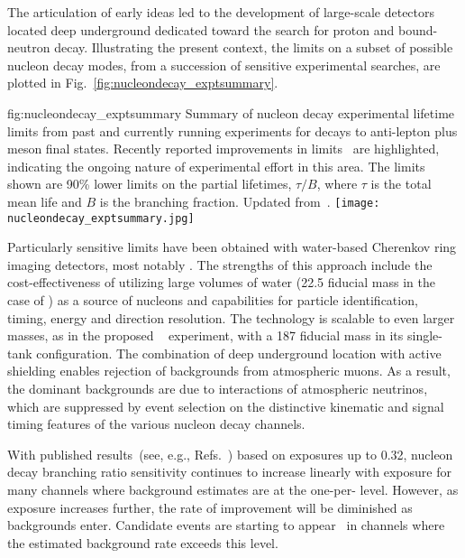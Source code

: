 The articulation of early  ideas led to the development of large-scale 
detectors located deep underground dedicated toward the search for proton and 
bound-neutron decay.  Illustrating the present context, the limits on a subset 
of possible nucleon decay modes, from a succession of sensitive experimental searches, 
are plotted in Fig.~\ref{fig:nucleondecay_exptsummary}.
%
\begin{dunefigure}
{fig:nucleondecay_exptsummary}
{Summary of nucleon decay experimental lifetime limits from past and currently 
running experiments for decays to anti-lepton plus meson final states.  Recently 
reported improvements in limits~\cite{TheSuper-Kamiokande:2017tit} are highlighted, 
indicating the ongoing nature of experimental effort in this area.
The limits shown are 90\%  lower limits on the partial lifetimes, 
$\tau/B$, where $\tau$ is the total mean life and $B$ is the branching fraction. 
Updated from~\cite{Babu:2013jba}.}
\texttt{[image: nucleondecay\_exptsummary.jpg]}
\end{dunefigure}
%

Particularly sensitive limits have been obtained with water-based Cherenkov ring 
imaging detectors, most notably \superk.  The strengths of this approach include 
the cost-effectiveness of utilizing large volumes of water (\SI{22.5}{\kt} fiducial 
mass in the case of \superk) as a source of nucleons and 
capabilities for particle identification, timing, energy and direction resolution.
The technology is scalable to even larger masses, as in the proposed 
\hyperk~\cite{Abe:2018uyc} experiment, with a \SI{187}{\kt} fiducial mass in its  
single-tank configuration.  The combination of deep underground location with active 
shielding enables rejection of backgrounds from atmospheric muons.  As a result, the 
dominant backgrounds are due to interactions of atmospheric neutrinos, which are suppressed 
by event selection on the distinctive kinematic and signal timing features of
the various nucleon decay channels. 

With published results~(see, e.g., 
Refs.~\cite{Abe:2014mwa,Miura:2016krn,TheSuper-Kamiokande:2017tit})
based on exposures up to \SI{0.32}{\Mtyr}, \superk 
nucleon decay branching ratio sensitivity continues to increase linearly 
with exposure for many channels where background estimates are at the 
one-per-\si{\Mtyr} level.  However, as exposure increases further, the 
rate of improvement will be diminished as backgrounds enter.    
Candidate events are starting to appear~\cite{TheSuper-Kamiokande:2017tit} 
in channels where the estimated background rate exceeds this level.  

